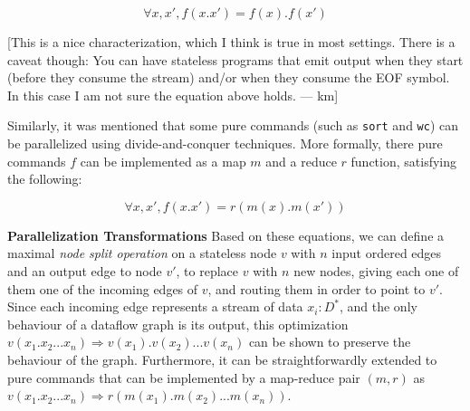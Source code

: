 \documentclass[sigplan,10pt,review,anonymous]{acmart}
\newcommand{\heading}[1]{\vspace{4pt}\noindent\textbf{#1}\enspace}
\newcommand{\ttt}[1]{\texttt{\small #1}}
\newcommand{\km}[1]{[{\color{blue}#1 --- km}]}
\newcommand{\tr}[1]{} %
\begin{document}
\[
\forall x, x', f(x.x') = f(x).f(x')
\]

\km{This is a nice characterization, which I think is true in most settings. There is a caveat though: You can have stateless programs that emit output when they start (before they consume the stream) and/or when they consume the EOF symbol. In this case I am not sure the equation above holds.}

Similarly, it was mentioned that some pure commands (such as
\ttt{sort} and \ttt{wc}) can be parallelized using divide-and-conquer
techniques. More formally, there pure commands $f$ can be implemented
as a map $m$ and a reduce $r$ function, satisfying the following:

\[
\forall x, x', f(x.x') = r(m(x).m(x'))
\]

\heading{Parallelization Transformations}
%
Based on these equations, we can define a maximal \emph{node split
  operation} on a stateless node $v$ with $n$ input ordered edges and
an output edge to node $v'$, to replace $v$ with $n$ new nodes, giving
each one of them one of the incoming edges of $v$, and routing them in
order to point to $v'$. Since each incoming edge represents a stream
of data $x_i : D^*$, and the only behaviour of a dataflow graph is its
output, this optimization $ v(x_1.x_2...x_n) \Rightarrow
v(x_1).v(x_2)...v(x_n)$ can be shown to preserve the behaviour of the
graph. Furthermore, it can be straightforwardly extended to pure
commands that can be implemented by a map-reduce pair $(m, r)$ as $
v(x_1.x_2...x_n) \Rightarrow r(m(x_1).m(x_2)...m(x_n))$.

\tr{Remember to mention the assumptions that need to hold for the
  graph transformations to be valid in the Command categories
  section. Commands must be deterministic, they must not do any other
  side effect (such as writing to other files, sending signals,
  etc). However, these assumptions must already be checked when the
  developer designates the categories.}

\tr{If there is time I can work out a formal definition and a proof
  sketch why this transformation preserves the output of the dataflow
  graph.}

\end{document}
